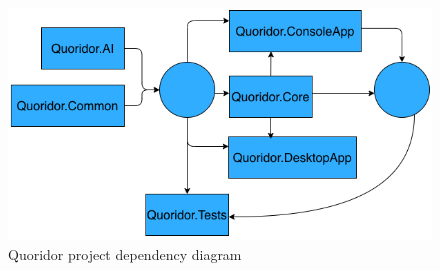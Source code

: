\begin{figure}[!ht]
    \centering
    \includegraphics[width=.95\linewidth]{../img/project_structure.png}
    \caption{Quoridor project dependency diagram}
    \label{fig:proj_dep}
\end{figure}